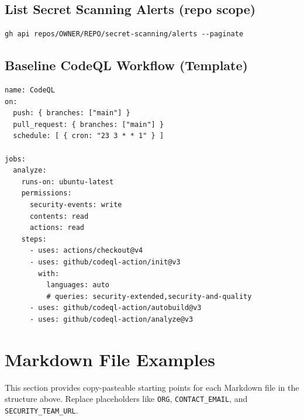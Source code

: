 \documentclass[11pt,letterpaper]{article}
\begin{document}
\subsection*{List Secret Scanning Alerts (repo scope)}
\begin{verbatim}
gh api repos/OWNER/REPO/secret-scanning/alerts --paginate
\end{verbatim}

\subsection*{Baseline CodeQL Workflow (Template)}
\begin{verbatim}
name: CodeQL
on:
  push: { branches: ["main"] }
  pull_request: { branches: ["main"] }
  schedule: [ { cron: "23 3 * * 1" } ]

jobs:
  analyze:
    runs-on: ubuntu-latest
    permissions:
      security-events: write
      contents: read
      actions: read
    steps:
      - uses: actions/checkout@v4
      - uses: github/codeql-action/init@v3
        with:
          languages: auto
          # queries: security-extended,security-and-quality
      - uses: github/codeql-action/autobuild@v3
      - uses: github/codeql-action/analyze@v3
\end{verbatim}
\clearpage

\section{Markdown File Examples}
This section provides copy-pasteable starting points for each Markdown file in the structure above. Replace placeholders like \texttt{ORG}, \texttt{CONTACT\_EMAIL}, and \texttt{SECURITY\_TEAM\_URL}.
\end{document}
